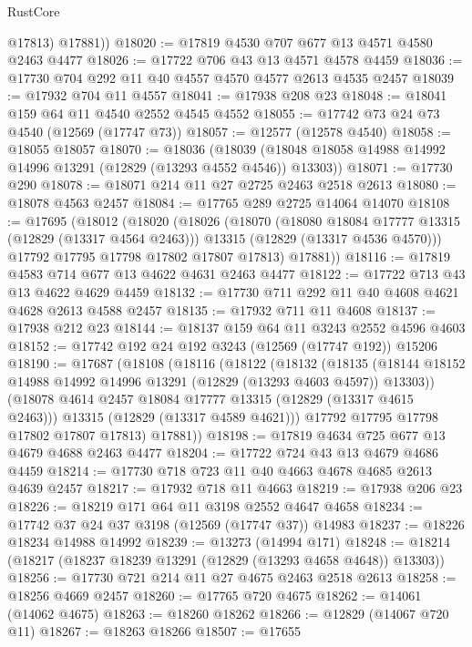 \begin{lexlean}{RustCore}
\begin{coremodule}
          @17813)
        @17881))
@18020 := @17819 @4530 @707 @677 @13 @4571 @4580 @2463 @4477
@18026 := @17722 @706 @43 @13 @4571 @4578 @4459
@18036 := @17730 @704 @292 @11 @40 @4557 @4570 @4577 @2613 @4535 @2457
@18039 := @17932 @704 @11 @4557
@18041 := @17938 @208 @23
@18048 := @18041 @159 @64 @11 @4540 @2552 @4545 @4552
@18055 := @17742 @73 @24 @73 @4540 (@12569 (@17747 @73))
@18057 := @12577 (@12578 @4540)
@18058 := @18055 @18057
@18070 := @18036
    (@18039 (@18048 @18058 @14988 @14992 @14996 @13291 (@12829 (@13293 @4552 @4546)) @13303))
@18071 := @17730 @290
@18078 := @18071 @214 @11 @27 @2725 @2463 @2518 @2613
@18080 := @18078 @4563 @2457
@18084 := @17765 @289 @2725 @14064 @14070
@18108 := @17695
    (@18012
      (@18020
        (@18026
          (@18070
            (@18080 @18084 @17777 @13315 (@12829 (@13317 @4564 @2463)))
            @13315
            (@12829 (@13317 @4536 @4570)))
          @17792
          @17795
          @17798
          @17802
          @17807
          @17813)
        @17881))
@18116 := @17819 @4583 @714 @677 @13 @4622 @4631 @2463 @4477
@18122 := @17722 @713 @43 @13 @4622 @4629 @4459
@18132 := @17730 @711 @292 @11 @40 @4608 @4621 @4628 @2613 @4588 @2457
@18135 := @17932 @711 @11 @4608
@18137 := @17938 @212 @23
@18144 := @18137 @159 @64 @11 @3243 @2552 @4596 @4603
@18152 := @17742 @192 @24 @192 @3243 (@12569 (@17747 @192)) @15206
@18190 := @17687
    (@18108
      (@18116
        (@18122
          (@18132
            (@18135
              (@18144 @18152 @14988 @14992 @14996 @13291 (@12829 (@13293 @4603 @4597)) @13303))
            (@18078 @4614 @2457 @18084 @17777 @13315 (@12829 (@13317 @4615 @2463)))
            @13315
            (@12829 (@13317 @4589 @4621)))
          @17792
          @17795
          @17798
          @17802
          @17807
          @17813)
        @17881))
@18198 := @17819 @4634 @725 @677 @13 @4679 @4688 @2463 @4477
@18204 := @17722 @724 @43 @13 @4679 @4686 @4459
@18214 := @17730 @718 @723 @11 @40 @4663 @4678 @4685 @2613 @4639 @2457
@18217 := @17932 @718 @11 @4663
@18219 := @17938 @206 @23
@18226 := @18219 @171 @64 @11 @3198 @2552 @4647 @4658
@18234 := @17742 @37 @24 @37 @3198 (@12569 (@17747 @37)) @14983
@18237 := @18226 @18234 @14988 @14992
@18239 := @13273 (@14994 @171)
@18248 := @18214 (@18217 (@18237 @18239 @13291 (@12829 (@13293 @4658 @4648)) @13303))
@18256 := @17730 @721 @214 @11 @27 @4675 @2463 @2518 @2613
@18258 := @18256 @4669 @2457
@18260 := @17765 @720 @4675
@18262 := @14061 (@14062 @4675)
@18263 := @18260 @18262
@18266 := @12829 (@14067 @720 @11)
@18267 := @18263 @18266
@18507 := @17655

\end{coremodule}
\end{lexlean}
